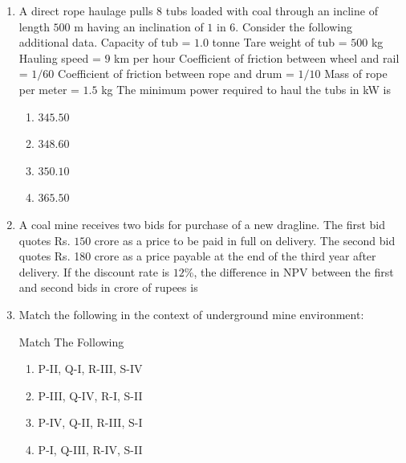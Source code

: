 \documentclass[journal,12pt,onecolumn]{IEEEtran}
\theoremstyle{remark}
\begin{document}
\begin{enumerate}
\hfill{}
\begin{multicols}{4}
\begin{enumerate}
\item $7.70$
\item $9.63$
\item $12.04$
\item $ 18.80$
\end{enumerate}
\end{multicols}

\item A direct rope haulage pulls $8$ tubs loaded with coal through an incline of length $500$ m having an
inclination of $1$ in $6$. Consider the following additional data.
Capacity of tub = $1.0$ tonne
Tare weight of tub = $500$ kg
Hauling speed = $9$ km per hour
Coefficient of friction between wheel and rail = $1/60$
Coefficient of friction between rope and drum = $1/10$
Mass of rope per meter = $1.5$ kg 
The minimum power required to haul the tubs in kW is

\hfill{}
\begin{multicols}{4}
\begin{enumerate}
\item $345.50$
\item $348.60$
\item $350.10$
\item $365.50$
\end{enumerate}
\end{multicols}

\item A coal mine receives two bids for purchase of a new dragline. The first bid quotes Rs. $150$ crore as a price to be paid in full on delivery. The second bid quotes Rs. 180 crore as a price payable at the end of the third year after delivery. If the discount rate is $12$\%, the difference in NPV between the first and second bids in crore of rupees is

\hfill{}

\item Match the following in the context of underground mine environment:
\begin{table}[H]
  \centering
  \caption{Match The Following}
  
  \label{tab:Table1}
\end{table}

\hfill{}
\begin{multicols}{2}
\begin{enumerate}
\item P-II, Q-I, R-III, S-IV
\item P-III, Q-IV, R-I, S-II
\item P-IV, Q-II, R-III, S-I
\item P-I, Q-III, R-IV, S-II
\end{enumerate}
\end{multicols}


\end{enumerate}
\end{document}
